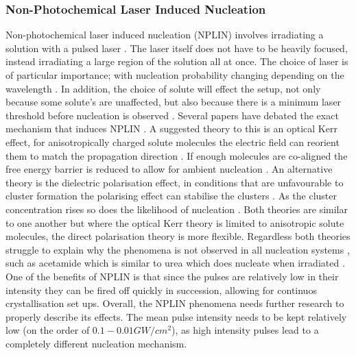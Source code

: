 \subsubsection{Non-Photochemical Laser Induced Nucleation}
Non-photochemical laser induced nucleation (NPLIN) involves irradiating 
a solution with a pulsed laser \cite{Garetz1996,Garetz2002,Sun2006}. 
The laser itself does not have to be heavily focused, instead irradiating
a large region of the solution all at once. The choice of laser is of
particular importance; with nucleation probability changing depending 
on the wavelength \cite{Kacker2017}. In addition, the choice of solute will effect the setup, not only because some solute's are unaffected, but also because there is a minimum laser threshold before nucleation is observed 
\cite{Garetz2002}. Several papers have debated the exact mechanism that 
induces NPLIN \cite{Garetz2002, Knott2011}. A suggested theory to this is 
an optical Kerr effect, for anisotropically charged solute molecules the 
electric field can reorient them to match the propagation direction 
\cite{Garetz2002}. If enough molecules are co-aligned the free energy 
barrier is reduced to allow for ambient nucleation \cite{Knott2011}. 
An alternative theory is the dielectric polarisation effect, in 
conditions that are unfavourable to cluster formation the polarising 
effect can stabilise the clusters \cite{Alexander2008}. As the cluster  concentration rises so does the likelihood of nucleation \cite{Vekilov2010}. 
Both theories are similar to one another but where the optical Kerr theory
is limited to anisotropic solute molecules, the direct polarisation 
theory is more flexible. Regardless both theories struggle to explain
why the phenomena is not observed in all nucleation systems 
\cite{Korede2023}, such as acetamide which is similar to urea which 
does nucleate when irradiated \cite{Ward2016}. One of the benefits of 
NPLIN is that since the pulses are relatively low in their intensity 
they can be fired off quickly in succession, allowing for continuos 
crystallisation set ups. Overall, the NPLIN phenomena needs further 
research to properly describe its effects. The mean pulse intensity 
needs to be kept relatively low (on the order of $0.1-0.01 GW/cm^2$), 
as high intensity pulses lead to a completely different nucleation 
mechanism.


